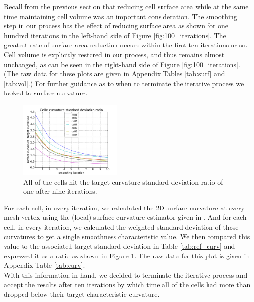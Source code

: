 \documentclass[a4paper,10pt]{article}
\begin{document}
Recall from the previous section that reducing cell surface area while at the same time maintaining cell volume was an important consideration. The smoothing step in our process has the effect of reducing surface area as shown for one hundred iterations in the left-hand side of Figure \ref{fig:100_iterations}. The greatest rate of surface area reduction occurs within the first ten iterations or so. Cell volume is explicitly restored in our process, and thus remains almost unchanged, as can be seen in the right-hand side of Figure \ref{fig:100_iterations}. (The raw data for these plots are given in Appendix Tables \ref{tab:surf} and \ref{tab:vol}.) For further guidance as to when to terminate the iterative process we looked to surface curvature.\\

\begin{figure}[H]
\begin{center}
\includegraphics[width=0.45\textwidth]{images/cell_curv_std.pdf}
\end{center}
\caption{All of the cells hit the target curvature standard deviation ratio of one after nine iterations.}
\label{fig:curv_std}
\end{figure}

For each cell, in every iteration, we calculated the 2D surface curvature at every mesh vertex using the (local) surface curvature estimator given in \cite{Rugis_2008_DSC}. And for each cell, in every iteration, we calculated the weighted standard deviation of those curvatures to get a single smoothness characteristic value. We then compared this value to the associated target standard deviation in Table \ref{tab:ref_curv} and expressed it as a ratio as shown in Figure \ref{fig:curv_std}. The raw data for this plot is given in Appendix Table \ref{tab:curv}.\\

With this information in hand, we decided to terminate the iterative process and accept the results after ten iterations by which time all of the cells had more than dropped below their target characteristic curvature.\\
\end{document}
